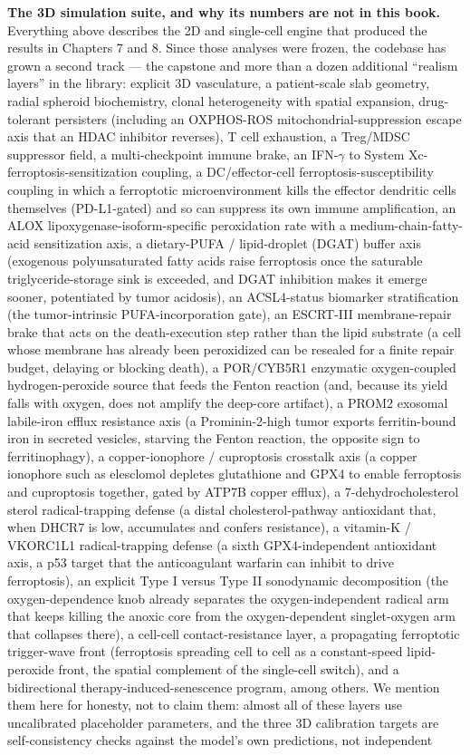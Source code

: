 \documentclass[11pt,twoside,openright]{report}
\begin{document}
\textbf{The 3D simulation suite, and why its numbers are not in this book.} Everything above describes the 2D and single-cell engine that produced the results in Chapters 7 and 8. Since those analyses were frozen, the codebase has grown a second track --- the  capstone and more than a dozen additional ``realism layers'' in the  library: explicit 3D vasculature, a patient-scale slab geometry, radial spheroid biochemistry, clonal heterogeneity with spatial expansion, drug-tolerant persisters (including an OXPHOS-ROS mitochondrial-suppression escape axis that an HDAC inhibitor reverses), T cell exhaustion, a Treg/MDSC suppressor field, a multi-checkpoint immune brake, an IFN-$\gamma$ to System Xc- ferroptosis-sensitization coupling, a DC/effector-cell ferroptosis-susceptibility coupling in which a ferroptotic microenvironment kills the effector dendritic cells themselves (PD-L1-gated) and so can suppress its own immune amplification, an ALOX lipoxygenase-isoform-specific peroxidation rate with a medium-chain-fatty-acid sensitization axis, a dietary-PUFA / lipid-droplet (DGAT) buffer axis (exogenous polyunsaturated fatty acids raise ferroptosis once the saturable triglyceride-storage sink is exceeded, and DGAT inhibition makes it emerge sooner, potentiated by tumor acidosis), an ACSL4-status biomarker stratification (the tumor-intrinsic PUFA-incorporation gate), an ESCRT-III membrane-repair brake that acts on the death-execution step rather than the lipid substrate (a cell whose membrane has already been peroxidized can be resealed for a finite repair budget, delaying or blocking death), a POR/CYB5R1 enzymatic oxygen-coupled hydrogen-peroxide source that feeds the Fenton reaction (and, because its yield falls with oxygen, does not amplify the deep-core artifact), a PROM2 exosomal labile-iron efflux resistance axis (a Prominin-2-high tumor exports ferritin-bound iron in secreted vesicles, starving the Fenton reaction, the opposite sign to ferritinophagy), a copper-ionophore / cuproptosis crosstalk axis (a copper ionophore such as elesclomol depletes glutathione and GPX4 to enable ferroptosis and cuproptosis together, gated by ATP7B copper efflux), a 7-dehydrocholesterol sterol radical-trapping defense (a distal cholesterol-pathway antioxidant that, when DHCR7 is low, accumulates and confers resistance), a vitamin-K / VKORC1L1 radical-trapping defense (a sixth GPX4-independent antioxidant axis, a p53 target that the anticoagulant warfarin can inhibit to drive ferroptosis), an explicit Type I versus Type II sonodynamic decomposition (the oxygen-dependence knob already separates the oxygen-independent radical arm that keeps killing the anoxic core from the oxygen-dependent singlet-oxygen arm that collapses there), a cell-cell contact-resistance layer, a propagating ferroptotic trigger-wave front (ferroptosis spreading cell to cell as a constant-speed lipid-peroxide front, the spatial complement of the single-cell switch), and a bidirectional therapy-induced-senescence program, among others. We mention them here for honesty, not to claim them: almost all of these layers use uncalibrated placeholder parameters, and the three 3D calibration targets are self-consistency checks against the model's own predictions, not independent 
\end{document}
